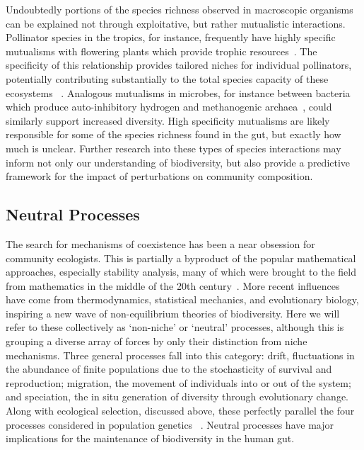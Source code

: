\documentclass[12pt]{article}
\begin{document}
Undoubtedly portions of the species richness observed in macroscopic
organisms can be explained not through exploitative,
but rather mutualistic interactions.
Pollinator species in the tropics, for instance, frequently
have highly specific mutualisms with flowering plants which
provide trophic resources~\citep{Bawa1990}.
The specificity of this relationship provides tailored niches
for individual pollinators, potentially contributing substantially
to the total species capacity of these ecosystems%
~\citep{Burger1981,Stebbins1981}.
Analogous mutualisms in microbes, for instance
between bacteria which produce auto-inhibitory hydrogen
and methanogenic archaea~\citep{Narihiro2014},
could similarly support increased diversity.
High specificity mutualisms are likely responsible for some of the species
richness found in the gut,
but exactly how much is unclear.
Further research into these types of species interactions
may inform not only our understanding of biodiversity,
but also provide a predictive framework for the impact of
perturbations on community composition.

\subsection{Neutral Processes}
The search for mechanisms of coexistence has been a near obsession for
community ecologists.
This is partially a byproduct of the popular mathematical approaches,
especially stability analysis,
many of which were brought to the field from mathematics
in the middle of the 20th century~\citep[e.g\@.][]{May1973,MacArthur1955}.
More recent influences have come from thermodynamics,
statistical mechanics, and evolutionary biology,
inspiring a new wave of non-equilibrium theories of biodiversity.
Here we will refer to these collectively as `non-niche' or `neutral'
processes,
although this is grouping a diverse array of forces by only their
distinction from niche mechanisms.
Three general processes fall into this category:
drift, fluctuations in the abundance of finite populations due to
the stochasticity of survival and reproduction;
migration, the movement of individuals into or out of the system;
and speciation, the in situ generation of diversity through
evolutionary change.
Along with ecological selection, discussed above,
these perfectly parallel the four processes considered in population genetics%
~\citep{Vellend2010}.
Neutral processes have major implications for the maintenance of
biodiversity in the human gut.
\end{document}
